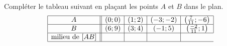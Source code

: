 
\begin{exercice}\label{exosmath-0019}

    Compléter le tableau suivant en plaçant les points \( A\) et \( B\) dans le plan.
    \begin{equation*}
        \begin{array}[]{|c||c|c|c|c|}
            \hline
            A&(0;0)&(1;2)&(-3;-2)&\left(\frac{ 7 }{ 11 };-6\right)\\
            \hline
            B&(6;9)&(3;4)&(-1;5)&\left(\frac{ -2 }{ 11 };1\right)\\
            \hline
            \text{milieu de \( [AB]\)}&&&\\
            \hline
        \end{array}
    \end{equation*}

\end{exercice}
